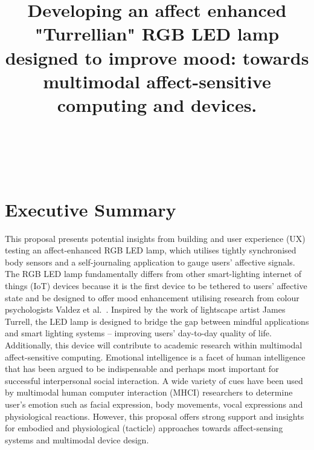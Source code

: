 \documentclass{sigchi}
\begin{document}
\title{Developing an affect enhanced "Turrellian" RGB LED lamp designed to improve mood: towards multimodal affect-sensitive computing and devices.}

\author{
\\
\\
\\
}


\maketitle

\section{Executive Summary}
This proposal presents potential insights from building and user experience (UX) testing an affect-enhanced RGB LED lamp, which utilises tightly synchronised body sensors and a self-journaling application to gauge users’ affective signals. The RGB LED lamp fundamentally differs from other smart-lighting internet of things (IoT) devices because it is the first device to be tethered to users’ affective state and be designed to offer mood enhancement utilising research from colour psychologists Valdez et al.~\cite{valdez1994effects}. Inspired by the work of lightscape artist James Turrell, the LED lamp is designed to bridge the gap between mindful applications and smart lighting systems – improving users’ day-to-day quality of life. Additionally, this device will contribute to academic research within multimodal affect-sensitive computing. Emotional intelligence is a facet of human intelligence that has been argued to be indispensable and perhaps most important for successful interpersonal social interaction. A wide variety of cues have been used by multimodal human computer interaction (MHCI) researchers to determine user’s emotion such as facial expression, body movements, vocal expressions and physiological reactions. However, this proposal offers strong support and insights for embodied and physiological (tacticle) approaches towards affect-sensing systems and multimodal device design.


\end{document}
